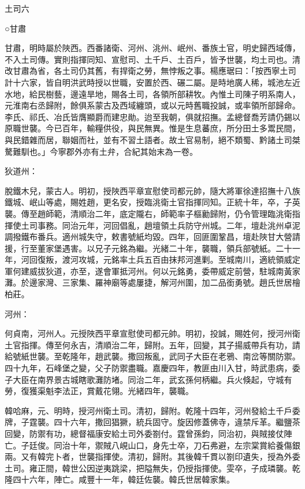 
\begin{pinyinscope}
土司六

○甘肅

甘肅，明時屬於陜西。西番諸衛、河州、洮州、岷州、番族土官，明史歸西域傳，不入土司傳。實則指揮同知、宣慰司、土千戶、土百戶，皆予世襲，均土司也。清改甘肅為省，各土司仍其舊，有捍衛之勞，無悖叛之事。楊應琚曰：「按西寧土司計十六家，皆自明洪武時授以世職，安置於西、碾二屬。是時地廣人稀，城池左近水地，給民樹藝，邊遠旱地，賜各土司，各領所部耕牧。內惟土司陳子明系南人，元淮南右丞歸附，餘俱系蒙古及西域纏頭，或以元時舊職投誠，或率領所部歸命。李氏、祁氏、冶氏皆膺顯爵而建忠勛。迨至我朝，俱就招撫。孟總督喬芳請仍錫以原職世襲。今已百年，輸糧供役，與民無異。惟是生息蕃庶，所分田土多鬻民間，與民錯雜而居，聯姻而社，並有不習土語者。故土官易制，絕不類蜀、黔諸土司桀驁難馴也。」今寧郡外亦有土弁，合紀其始末為一卷。

狄道州：

脫鐵木兒，蒙古人。明初，授陜西平章宣慰使司都元帥，隨大將軍徐達招撫十八族鐵城、岷山等處，賜姓趙，更名安，授臨洮衛土官指揮同知。正統十年，卒，子英襲。傳至趙師範，清順治二年，底定隴右，師範率子樞勷歸附，仍令管理臨洮衛指揮使土司事務。同治元年，河回倡亂，趙壇領土兵防守州城。二年，壇赴洮州卓泥調撥鐵布番兵。適州城失守，敕書號紙均毀。四年，回匪圍鞏昌，壇赴陜甘大營請援，行至董家堡遇害。以兄子元銘為繼。光緒二十年，襲職，領兵部號紙。二十一年，河回復叛，渡河攻城，元銘率土兵五百由抹邦河進剿。至城南川，適統領威定軍何建威拔狄道，亦至，遂會軍抵河州。何以元銘勇，委帶威定前營，駐城南黃家灘。於邊家灣、三家集、羅神廟等處屢捷，解河州圍，加二品銜勇號。趙氏世居檜柏莊。

河州：

何貞南，河州人。元授陜西平章宣慰使司都元帥。明初，投誠，賜姓何，授河州衛土官指揮。傳至何永吉，清順治二年，歸附。五年，回變，其子揚威帶兵有功，請給號紙世襲。至乾隆年，趙武襲。撒回叛亂，武同子大臣在老鴉、南岔等關防禦。四十九年，石峰堡之變，父子防禦盡職。嘉慶四年，教匪由川入甘，時武患病，委子大臣在南界景古城瞎歌灘防堵。同治二年，武玄孫何柄繼。兵火倏起，守城有勞，復獲渠魁李法正，賞戴花翎。光緒四年，襲職。

韓哈麻，元、明時，授河州衛土司。清初，歸附。乾隆十四年，河州發給土千戶委牌，子霆襲。四十六年，撒回猖獗，統兵固守。旋因修蓋佛寺，違禁斥革。繼鹽茶回變，防禦有功，總督福康安給土司外委劄付。霆曾孫鈞，同治初，與賊接仗陣亡。子廷俊。同治十年，禦賊八峴山口，身先士卒，刀石弗避，左宗棠賞給養傷銀兩。又有韓完卜者，世襲指揮使。清初，歸附。其後韓千貫以劄印遺失，授為外委土司。雍正間，韓世公因逆夷跳梁，把隘無失，仍授指揮使。雯卒，子成璘襲。乾隆四十六年，陣亡。咸豐十一年，韓廷佐襲。韓氏世居韓家集。


\end{pinyinscope}
